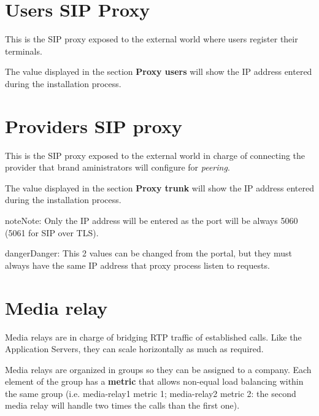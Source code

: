 \documentclass[letterpaper,10pt,english]{sphinxmanual}
\begin{document}
\section{Users SIP Proxy}
\label{platform/proxy_users:proxyusers}\label{platform/proxy_users::doc}\label{platform/proxy_users:users-sip-proxy}
This is the SIP proxy exposed to the external world where users register their
terminals.

The value displayed in the section \textbf{Proxy users} will show the IP address
entered during the installation process.

\noindent{}


\section{Providers SIP proxy}
\label{platform/proxy_trunks:providers-sip-proxy}\label{platform/proxy_trunks::doc}
This is the SIP proxy exposed to the external world in charge of connecting
the provider that brand aministrators will configure for \emph{peering}.

The value displayed in the section \textbf{Proxy trunk} will show the IP address
entered during the installation process.

\noindent{}

\begin{notice}{note}{Note:}
Only the IP address will be entered as the port will be always 5060
(5061 for SIP over TLS).
\end{notice}

\begin{notice}{danger}{Danger:}
This 2 values can be changed from the portal, but they must always
have the same IP address that proxy process listen to requests.
\end{notice}


\section{Media relay}
\label{platform/media_relays:media-relay}\label{platform/media_relays::doc}
Media relays are in charge of bridging RTP traffic of established calls. Like
the Application Servers, they can scale horizontally as much as required.

Media relays are organized in groups so they can be assigned to a company. Each
element of the group has a \textbf{metric} that allows non-equal load balancing
within the same group (i.e. media-relay1 metric 1; media-relay2 metric 2:
the second media relay will handle two times the calls than the first one).
\end{document}
